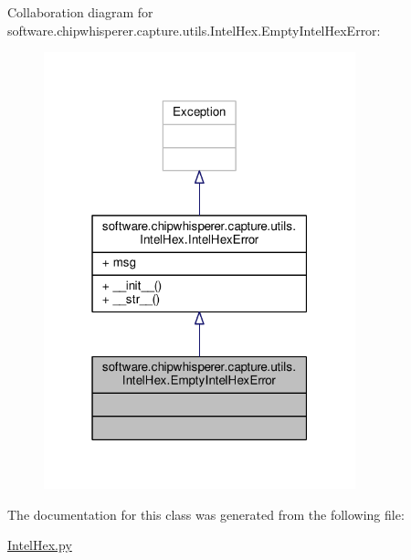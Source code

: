 Collaboration diagram for software.\+chipwhisperer.\+capture.\+utils.\+Intel\+Hex.\+Empty\+Intel\+Hex\+Error\+:\nopagebreak
\begin{figure}[H]
\begin{center}
\leavevmode
\includegraphics[width=256pt]{d8/df6/classsoftware_1_1chipwhisperer_1_1capture_1_1utils_1_1IntelHex_1_1EmptyIntelHexError__coll__graph}
\end{center}
\end{figure}


The documentation for this class was generated from the following file\+:\begin{DoxyCompactItemize}
\item 
\hyperlink{IntelHex_8py}{Intel\+Hex.\+py}\end{DoxyCompactItemize}
